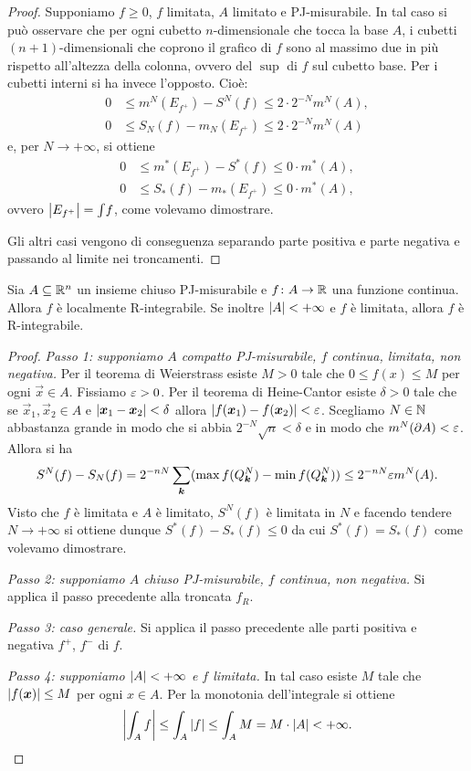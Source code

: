 \begin{proof}
Supponiamo $f\ge 0$, $f$ limitata, $A$ limitato e PJ-misurabile.
In tal caso si può osservare che 
per ogni cubetto $n$-dimensionale che tocca la base $A$, 
i cubetti $(n+1)$-dimensionali che coprono il grafico di $f$ 
sono al massimo due in più rispetto all'altezza della colonna, 
ovvero del $\sup$ di $f$ sul cubetto base. 
Per i cubetti interni si ha invece l'opposto. Cioè:
\begin{align*}
    0 & \le m^N(E_{f^+}) - S^N(f) \le 2\cdot 2^{-N} m^N(A),\\
    0 & \le S_N(f) - m_N(E_{f^+}) \le 2\cdot 2^{-N} m^N(A)
\end{align*}
e, per $N\to +\infty$, si ottiene 
\begin{align*}
  0 &\le m^*(E_{f^+}) - S^*(f) \le 0\cdot m^*(A), \\
  0 &\le S_*(f) - m_*(E_{f^+}) \le 0\cdot m^*(A), 
\end{align*}
ovvero ${\left|E_{f^+}\right|}=\int\! f$, come volevamo dimostrare.

Gli altri casi vengono di conseguenza separando parte positiva e parte negativa 
e passando al limite nei troncamenti.
\end{proof}

\begin{theorem}
  \label{th:continua_integrabile}
Sia $A\subseteq {\mathbb R}^n$ un insieme chiuso PJ-misurabile e $f\colon A \to {\mathbb R}$ una funzione 
continua. Allora $f$ è localmente R-integrabile. 
Se inoltre ${\left|A\right|}<+\infty$ e $f$ 
è limitata, allora $f$ è R-integrabile.
\end{theorem}
%
\begin{proof}
\emph{Passo 1: supponiamo $A$ compatto PJ-misurabile, 
$f$ continua, limitata, non negativa.}
Per il teorema di Weierstrass esiste $M>0$ tale che $0\le f(x) \le M$ per 
ogni $\vec x \in A$.
Fissiamo $\varepsilon>0$.
Per il teorema di Heine-Cantor esiste $\delta>0$ tale 
che se $\vec x_1,\vec x_2\in A$ e ${\left|\boldsymbol x_1 -\boldsymbol x_2\right|}<\delta$ 
allora ${\left|f(\boldsymbol x_1)-f(\boldsymbol x_2)\right|}< \varepsilon$. 
Scegliamo $N\in {\mathbb N}$ abbastanza grande in modo che si abbia $2^{-N}\sqrt n < \delta$
e in modo che $m^N(\partial A)<\varepsilon$.
Allora si ha
\[
  S^N(f) - S_N(f) 
  = 2^{-nN}\sum_{\boldsymbol k} (\max f(Q^N_{\boldsymbol k})-\min f(Q^N_{\boldsymbol k})) 
  \le 2^{-nN}\varepsilon m^N(A).
\]
Visto che $f$ è limitata e $A$ è limitato, $S^N(f)$ è limitata in $N$ 
e facendo tendere $N\to+\infty$ si ottiene 
dunque $S^*(f)-S_*(f) \le 0$ da cui $S^*(f)=S_*(f)$ come volevamo dimostrare.

\emph{Passo 2: supponiamo $A$ chiuso PJ-misurabile, $f$ continua, non negativa.} 
Si applica il passo precedente alla troncata $f_R$.

\emph{Passo 3: caso generale.}
Si applica il passo precedente alle parti 
positiva e negativa $f^+$, $f^-$ di $f$.

\emph{Passo 4: supponiamo ${\left|A\right|}<+\infty$ e $f$ limitata.}  
In tal caso esiste $M$ tale che ${\left|f(\boldsymbol x)\right|}\le M$ per 
ogni $x\in A$. 
Per la monotonia dell'integrale si ottiene 
\[
  {\left|\int_A f\right|} 
  \le \int_A {\left|f\right|}
  \le \int_A M = M \cdot {\left|A\right|} < +\infty.  
\]
\end{proof}

